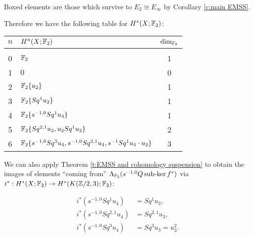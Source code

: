 Boxed elements are those which survive to $E_2\cong E_\infty$ by Corollary \ref{c:main EMSS}. 

\newpage
Therefore we have the following table for $H^*(X;\mathbb{F}_2)$:

\bigskip
\begin{tabular}{|c|l|c|}
\hline $n$ &$H^n(X;\mathbb{F}_2)$ &$\dim_{\mathbb{F}_2}$\\
\hline&&\\
0 &$\mathbb{F}_2$ &1\\
1 &$0$ &0\\
2 &$\mathbb{F}_2\{u_2\}$ &1\\
3 &$\mathbb{F}_2\{Sq^1u_2\}$ &1\\
4 &$\mathbb{F}_2\{s^{-1,0}Sq^1u_4\}$ &1\\
5 &$\mathbb{F}_2\{Sq^{2,1}u_2,u_2Sq^1u_2\}$ &2\\
6 &$\mathbb{F}_2\{s^{-1,0}Sq^3u_4,s^{-1,0}Sq^{2,1}u_4,s^{-1}Sq^1u_4\cdot u_2\}$ &3\\
\hline
\end{tabular}

\bigskip
We can also apply Theorem \ref{t:EMSS and cohomology suspension} to obtain the images of elements ``coming from'' $\Lambda_{\mathbb{F}_2}(s^{-1,0}Q\operatorname{sub-ker} f^*)$ via $i^*:H^*(X;\mathbb{F}_2)\to H^*(K(\mathbb{Z}/2,3);\mathbb{F}_2)$:

\begin{align*}
i^*(s^{-1,0}Sq^1u_4) &=Sq^1u_3,\\
i^*(s^{-1,0}Sq^{2,1}u_4) &=Sq^{2,1}u_3,\\
i^*(s^{-1,0}Sq^{3}u_4) &=Sq^{3}u_3=u_3^2.\\
\end{align*}

\endinput